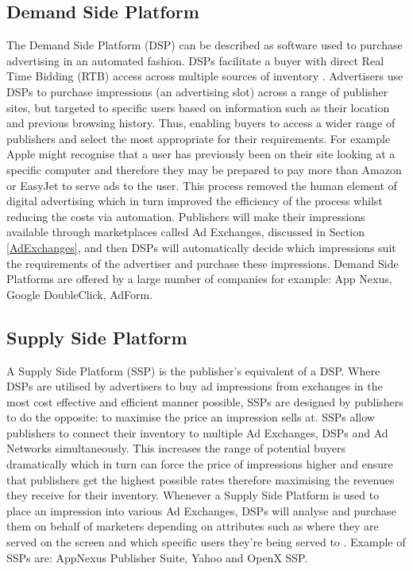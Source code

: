 \documentclass[12pt]{article}
\begin{document}
\subsection{Demand Side Platform} \label{DSP}
The Demand Side Platform (DSP) can be described as software used to purchase advertising in an automated fashion. DSPs facilitate a buyer with direct Real Time Bidding (RTB) access across multiple sources of inventory \parencite{introDSP}. Advertisers use DSPs to purchase impressions (an advertising slot) across a range of publisher sites, but targeted to specific users based on information such as their location and previous browsing history. Thus, enabling buyers to access a wider range of publishers and select the most appropriate for their requirements. For example Apple might recognise that a user has previously been on their site looking at a specific computer and therefore they may be prepared to pay more than Amazon or EasyJet to serve ads to the user. This process removed the human element of digital advertising which in turn improved the efficiency of the process whilst reducing the costs via automation. Publishers will make their impressions available through marketplaces called Ad Exchanges, discussed in Section \ref{AdExchanges}, and then DSPs will automatically decide which impressions suit the requirements of the advertiser and purchase these impressions. Demand Side Platforms are offered by a large number of companies for example: App Nexus, Google DoubleClick, AdForm. 

\subsection{Supply Side Platform} \label{SSP}
A Supply Side Platform (SSP) is the publisher's equivalent of a DSP. Where DSPs are utilised by advertisers to buy ad impressions from exchanges in the most cost effective and efficient manner possible, SSPs are designed by publishers to do the opposite: to maximise the price an impression sells at. SSPs allow publishers to connect their inventory to multiple Ad Exchanges, DSPs and Ad Networks simultaneously. This increases the range of potential buyers dramatically which in turn can force the price of impressions higher and ensure that publishers get the highest possible rates therefore maximising the revenues they receive for their inventory. Whenever a Supply Side Platform is used to place an impression into various Ad Exchanges, DSPs will analyse and purchase them on behalf of marketers depending on attributes such as where they are served on the screen and which specific users they're being served to \parencite{introDSP}. Example of SSPs are: AppNexus Publisher Suite, Yahoo and OpenX SSP.  
\end{document}
